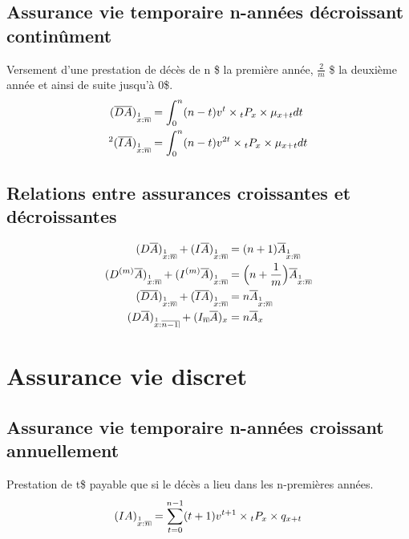 \documentclass[11pt,french]{report}
\makeatletter
\DeclareRobustCommand{\annuity}[1]{%
\def\arraystretch{0}%
\setlength\arraycolsep{.7pt}%
\setlength\arrayrulewidth{.3pt}%
\begin{array}[b]{@{}c|}\hline
\\[\arraycolsep]%
\scriptstyle #1%
\end{array}%
}
\newcommand{\indiceGauche}[2]{{\vphantom{#2}}_{#1}#2}
\makeatother
\begin{document}
\subsection{Assurance vie temporaire n-années décroissant continûment}
Versement d'une prestation de décès de n \$ la première année, $\frac{2}{m}$ \$ la deuxième année et ainsi de suite jusqu'à 0\$.
\begin{align*}
(\overline{DA})_{\overset{1}{x}:\annuity{n}} &= \int_{0}^{n} (n - t) v^t \times \indiceGauche{t}{P}_{x}\times \mu_{x+t}dt \\
{}^2(\overline{IA})_{\overset{1}{x}:\annuity{n}} &= \int_{0}^{n}(n - t) v^{2t} \times \indiceGauche{t}{P}_{x}\times \mu_{x+t}dt \\
\end{align*}

\subsection{Relations entre assurances croissantes et décroissantes}
\begin{align*}
(D\overline{A})_{\overset{1}{x}:\annuity{n}} + (I\overline{A})_{\overset{1}{x}:\annuity{n}} &= (n+1) \overline{A}_{\overset{1}{x}:\annuity{n}} \\
(D^{(m)}\overline{A})_{\overset{1}{x}:\annuity{n}} + (I^{(m)}\overline{A})_{\overset{1}{x}:\annuity{n}} &= \Big(n + \frac{1}{m} \Big) \overline{A}_{\overset{1}{x}:\annuity{n}} \\
(\overline{DA})_{\overset{1}{x}:\annuity{n}} + (\overline{IA})_{\overset{1}{x}:\annuity{n}} &= n \overline{A}_{\overset{1}{x}:\annuity{n}} \\
(D\overline{A})_{\overset{1}{x}:\annuity{n-1}} + (I_{\annuity{n}}\overline{A})_{x} &= n \overline{A}_{x} \\
\end{align*}

\section{Assurance vie discret}


\subsection{Assurance vie  temporaire n-années croissant annuellement}
Prestation de t\$ payable que si le décès a lieu dans les n-premières années.
\begin{align*}
(IA)_{\overset{1}{x}:\annuity{n}} &= \sum_{t=0}^{n-1}(t +1 )v^{t+1} \times \indiceGauche{t}{P}_{x} \times q_{x+t}\\
\end{align*}
\end{document}
